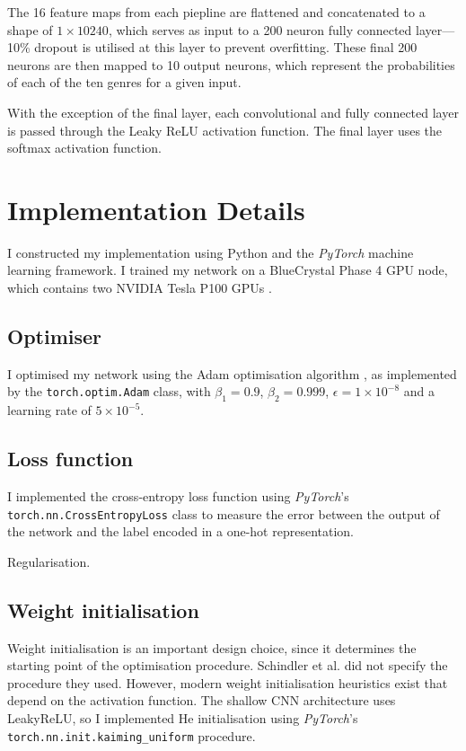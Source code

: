 \documentclass[conference]{IEEEtran}
\begin{document}
The 16 feature maps from each piepline are flattened and concatenated to a shape of $1\times10240$, which serves as input to a 200 neuron fully connected layer---10\% dropout is utilised at this layer to prevent overfitting.
These final 200 neurons are then mapped to 10 output neurons, which represent the probabilities of each of the ten genres for a given input.

With the exception of the final layer, each convolutional and fully connected layer is passed through the Leaky ReLU activation function.
The final layer uses the softmax activation function.

\section{Implementation Details}

I constructed my implementation using Python and the \textit{PyTorch} \cite{PyTorch} machine learning framework.
I trained my network on a BlueCrystal Phase 4 GPU node, which contains two NVIDIA Tesla P100 GPUs \cite{bc4}.

\subsection{Optimiser}

I optimised my network using the Adam optimisation algorithm \cite{KingmaBa}, as implemented by the \texttt{torch.optim.Adam} class, with $\beta_1=0.9$, $\beta_2=0.999$, $\epsilon=1\times10^{-8}$ and a learning rate of $5\times10^{-5}$.

\subsection{Loss function}

I implemented the cross-entropy loss function using \textit{PyTorch}'s \texttt{torch.nn.CrossEntropyLoss} class to measure the error between the output of the network and the label encoded in a one-hot representation.

Regularisation.

\subsection{Weight initialisation}

Weight initialisation is an important design choice, since it determines the starting point of the optimisation procedure.
Schindler et al. did not specify the procedure they used.
However, modern weight initialisation heuristics exist that depend on the activation function.
The shallow CNN architecture uses LeakyReLU, so I implemented He initialisation using \textit{PyTorch}'s \texttt{torch.nn.init.kaiming\_uniform} procedure.
\end{document}
